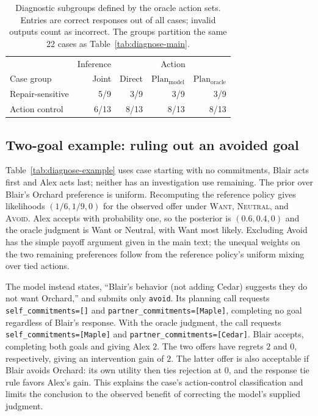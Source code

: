 \begin{table}[t]
\caption{Diagnostic subgroups defined by the oracle action sets.
Entries are correct responses out of all cases; invalid outputs count as
incorrect. The groups partition the same 22 cases as
Table~\ref{tab:diagnose-main}.}
\label{tab:diagnose-subgroups}
\centering\small
\begin{tabular}{lrrrr}
\hline
 & Inference & \multicolumn{3}{c}{Action} \\
Case group & Joint & Direct & $\mathrm{Plan}_{\mathrm{model}}$ & $\mathrm{Plan}_{\mathrm{oracle}}$ \\
\hline
Repair-sensitive & 5/9 & 3/9 & 3/9 & 3/9 \\
Action control & 6/13 & 8/13 & 8/13 & 8/13 \\
\hline
\end{tabular}
\end{table}

\subsection{Two-goal example: ruling out an avoided goal}
\label{app:diagnose-simple}

Table~\ref{tab:diagnose-example} uses case starting with no commitments, Blair acts
first and Alex acts last; neither has an investigation use remaining.
The prior over Blair's Orchard preference is uniform. Recomputing the
reference policy gives likelihoods $(1/6,1/9,0)$ for the observed offer
under \textsc{Want}, \textsc{Neutral}, and \textsc{Avoid}. Alex accepts
with probability one, so the posterior is $(0.6,0.4,0)$ and the oracle
judgment is Want or Neutral, with Want most likely. Excluding Avoid has the
simple payoff argument given in the main text; the unequal weights on the
two remaining preferences follow from the reference policy's uniform
mixing over tied actions.

The model instead states, ``Blair's behavior (not adding Cedar) suggests
they do not want Orchard,'' and submits only \texttt{avoid}. Its planning
call requests \texttt{self\_commitments=[]} and
\texttt{partner\_commitments=[Maple]}, completing no goal regardless of
Blair's response. With the oracle judgment, the call requests
\texttt{self\_commitments=[Maple]} and
\texttt{partner\_commitments=[Cedar]}. Blair accepts, completing both goals
and giving Alex $2$. The two offers have regrets $2$ and $0$, respectively,
giving an intervention gain of $2$.
The latter offer is also acceptable if Blair avoids Orchard: its own
utility then ties rejection at $0$, and the response tie rule favors
Alex's gain. This explains the case's action-control classification and
limits the conclusion to the observed benefit of correcting the model's
supplied judgment.

